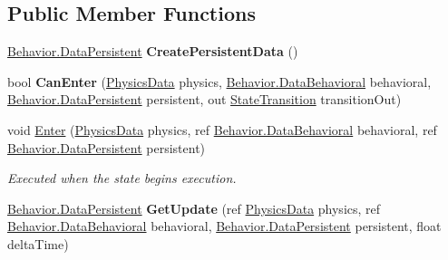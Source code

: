 \subsection*{Public Member Functions}
\begin{DoxyCompactItemize}
\item 
\hypertarget{class_skyrates_1_1_a_i_1_1_state_1_1_state_a2f1f04f9cbe51e2e06d0de6a38d702a2}{\hyperlink{class_skyrates_1_1_a_i_1_1_behavior_1_1_data_persistent}{Behavior.\-Data\-Persistent} {\bfseries Create\-Persistent\-Data} ()}\label{class_skyrates_1_1_a_i_1_1_state_1_1_state_a2f1f04f9cbe51e2e06d0de6a38d702a2}

\item 
\hypertarget{class_skyrates_1_1_a_i_1_1_state_1_1_state_a6edc7aeaa984bbb1e6e6d7e305684ca2}{bool {\bfseries Can\-Enter} (\hyperlink{class_skyrates_1_1_physics_1_1_physics_data}{Physics\-Data} physics, \hyperlink{class_skyrates_1_1_a_i_1_1_behavior_1_1_data_behavioral}{Behavior.\-Data\-Behavioral} behavioral, \hyperlink{class_skyrates_1_1_a_i_1_1_behavior_1_1_data_persistent}{Behavior.\-Data\-Persistent} persistent, out \hyperlink{class_skyrates_1_1_a_i_1_1_state_1_1_state_transition}{State\-Transition} transition\-Out)}\label{class_skyrates_1_1_a_i_1_1_state_1_1_state_a6edc7aeaa984bbb1e6e6d7e305684ca2}

\item 
void \hyperlink{class_skyrates_1_1_a_i_1_1_state_1_1_state_a73588c6a31317e1356ee5ecabf8a292c}{Enter} (\hyperlink{class_skyrates_1_1_physics_1_1_physics_data}{Physics\-Data} physics, ref \hyperlink{class_skyrates_1_1_a_i_1_1_behavior_1_1_data_behavioral}{Behavior.\-Data\-Behavioral} behavioral, ref \hyperlink{class_skyrates_1_1_a_i_1_1_behavior_1_1_data_persistent}{Behavior.\-Data\-Persistent} persistent)
\begin{DoxyCompactList}\small\item\em Executed when the state begins execution. \end{DoxyCompactList}\item 
\hypertarget{class_skyrates_1_1_a_i_1_1_state_1_1_state_ab47704b5a44e02ff9daba4b6e4e2c88c}{\hyperlink{class_skyrates_1_1_a_i_1_1_behavior_1_1_data_persistent}{Behavior.\-Data\-Persistent} {\bfseries Get\-Update} (ref \hyperlink{class_skyrates_1_1_physics_1_1_physics_data}{Physics\-Data} physics, ref \hyperlink{class_skyrates_1_1_a_i_1_1_behavior_1_1_data_behavioral}{Behavior.\-Data\-Behavioral} behavioral, \hyperlink{class_skyrates_1_1_a_i_1_1_behavior_1_1_data_persistent}{Behavior.\-Data\-Persistent} persistent, float delta\-Time)}\label{class_skyrates_1_1_a_i_1_1_state_1_1_state_ab47704b5a44e02ff9daba4b6e4e2c88c}


\end{DoxyCompactItemize}
